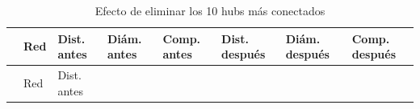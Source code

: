 \documentclass[
  letterpaper,
  DIV=11,
  numbers=noendperiod]{scrreprt}
\begin{document}
\begin{tcolorbox}
\begin{longtable}[]{@{}
  >{\raggedright\arraybackslash}p{}
  >{\raggedright\arraybackslash}p{}
  >{\raggedleft\arraybackslash}p{}
  >{\raggedleft\arraybackslash}p{}
  >{\raggedleft\arraybackslash}p{}
  >{\raggedleft\arraybackslash}p{}
  >{\raggedleft\arraybackslash}p{}
  >{\raggedleft\arraybackslash}p{}@{}}
\caption{Efecto de eliminar los 10 hubs más conectados}\tabularnewline
\toprule\noalign{}
\begin{minipage}[b]{\linewidth}\raggedright
\end{minipage} & \begin{minipage}[b]{\linewidth}\raggedright
Red
\end{minipage} & \begin{minipage}[b]{\linewidth}\raggedleft
Dist. antes
\end{minipage} & \begin{minipage}[b]{\linewidth}\raggedleft
Diám. antes
\end{minipage} & \begin{minipage}[b]{\linewidth}\raggedleft
Comp. antes
\end{minipage} & \begin{minipage}[b]{\linewidth}\raggedleft
Dist. después
\end{minipage} & \begin{minipage}[b]{\linewidth}\raggedleft
Diám. después
\end{minipage} & \begin{minipage}[b]{\linewidth}\raggedleft
Comp. después
\end{minipage} \\
\midrule\noalign{}
\endfirsthead
\toprule\noalign{}
\begin{minipage}[b]{\linewidth}\raggedright
\end{minipage} & \begin{minipage}[b]{\linewidth}\raggedright
Red
\end{minipage} & \begin{minipage}[b]{\linewidth}\raggedleft
Dist. antes
\end{minipage} & \begin{minipage}[b]{\linewidth}\raggedleft

\end{minipage}
\end{longtable}
\end{tcolorbox}
\end{document}
